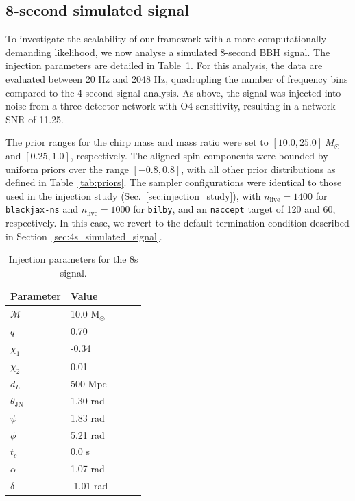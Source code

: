 \documentclass[fleqn,usenatbib]{mnras}
\begin{document}
\subsection{8-second simulated signal}
\label{sec:8s_simulated_signal}

To investigate the scalability of our framework with a more
computationally demanding likelihood, we now analyse a simulated
8-second BBH signal. The injection parameters are detailed in
Table~\ref{tab:8s_injection_params}. For this analysis, the data are
evaluated between 20 Hz and 2048 Hz, quadrupling the number of
frequency bins compared to the 4-second signal analysis. As above, the signal was
injected into noise from a three-detector network with O4 sensitivity,
resulting in a network SNR of 11.25.

The prior ranges for the chirp mass and mass ratio were set to
$[10.0, 25.0]~M_{\odot}$ and $[0.25, 1.0]$, respectively. The aligned
spin components were bounded by uniform priors over the range
$[-0.8, 0.8]$, with all other prior distributions as defined in
Table~\ref{tab:priors}. The sampler configurations were identical to
those used in the injection study (Sec.~\ref{sec:injection_study}), with
$n_{\text{live}}=1400$ for \texttt{blackjax-ns} and
$n_{\text{live}}=1000$ for \texttt{bilby}, and an \texttt{naccept}
target of 120 and 60, respectively. In this case, we revert to the 
default termination condition described in Section~\ref{sec:4s_simulated_signal}.

\begin{table}
    \centering
    \caption{Injection parameters for the 8s signal.}
    \label{tab:8s_injection_params}
    \begin{tabular}{l l l c c}
    \hline
    \hline
    \textbf{Parameter} & \textbf{Value} \\
    \hline
    $\mathcal{M}$ & 10.0 M$_{\odot}$ \\
    $q$ & 0.70 \\
    $\chi_1$ & -0.34 \\
    $\chi_2$ & 0.01 \\
    $d_L$ & 500 Mpc \\
    $\theta_{\textrm{JN}}$ & 1.30 rad \\
    $\psi$ & 1.83 rad \\
    $\phi$ & 5.21 rad \\
    $t_c$ & 0.0 s\\
    $\alpha$ & 1.07 rad \\
    $\delta$ & -1.01 rad \\
    \hline
    \hline
    \end{tabular}
    \end{table}
\end{document}
